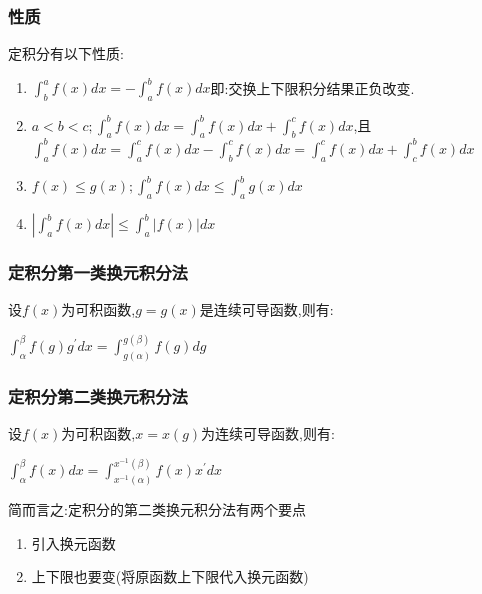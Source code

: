 \documentclass[UTF8,12pt]{ctexbook}
\newcommand{\derivative}{^\prime}
\newcommand{\defFunction}[1]{f(#1)}
\newcommand{\definiteIntegral}[2]{\int^{#1}_{#2}}
\begin{document}
{{{\subsubsection{性质}{
  定积分有以下性质:
  \begin{enumerate}
    \item $\definiteIntegral{a}{b}\defFunction{x}dx = -\definiteIntegral{b}{a}\defFunction{x}dx$即:交换上下限积分结果正负改变.
    \item $a < b < c; \definiteIntegral{b}{a}\defFunction{x}dx = \definiteIntegral{b}{a}\defFunction{x}dx + \definiteIntegral{c}{b}\defFunction{x}dx$,且$\definiteIntegral{b}{a}\defFunction{x}dx = \definiteIntegral{c}{a}\defFunction{x}dx - \definiteIntegral{c}{b}\defFunction{x}dx = \definiteIntegral{c}{a}\defFunction{x}dx + \definiteIntegral{b}{c}\defFunction{x}dx$
    \item $\defFunction{x} \leq g(x); \definiteIntegral{b}{a}\defFunction{x}dx \leq \definiteIntegral{b}{a}g(x)dx$
    \item $|\definiteIntegral{b}{a}\defFunction{x}dx|\leq\definiteIntegral{b}{a}|\defFunction{x}|dx$
  \end{enumerate}
}%

\subsubsection{定积分第一类换元积分法}{
  设$\defFunction{x}$为可积函数,$g = g(x)$是连续可导函数,则有:

  $\definiteIntegral{\beta}{\alpha} \defFunction{g}g\derivative dx = \definiteIntegral{g(\beta)}{g(\alpha)} \defFunction{g}dg$
}%

\subsubsection{定积分第二类换元积分法}{
  设$\defFunction{x}$为可积函数,$x = x(g)$为连续可导函数,则有:

  $\definiteIntegral{\beta}{\alpha} \defFunction{x}dx = \definiteIntegral{x^{-1}(\beta)}{x^{-1}(\alpha)}\defFunction{x}x\derivative dx$

  简而言之:定积分的第二类换元积分法有两个要点
  \begin{enumerate}
    \item 引入换元函数
    \item 上下限也要变(将原函数上下限代入换元函数)
  \end{enumerate}
}%

}}}
\end{document}
